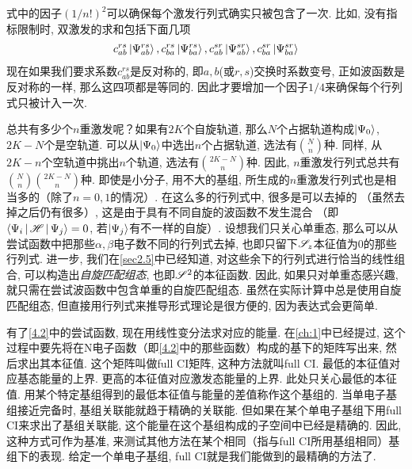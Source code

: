 式中的因子$(1/n!)^2$可以确保每个激发行列式确实只被包含了一次. 
比如, 
没有指标限制时, 
双激发的求和包括下面几项
\begin{align*}
c_{ab}^{rs}\Ket{\Psi_{ab}^{rs}}, 
c_{ba}^{rs}\Ket{\Psi_{ba}^{rs}}, 
c_{ab}^{sr}\Ket{\Psi_{ab}^{sr}},
c_{ba}^{sr}\Ket{\Psi_{ba}^{sr}}
\end{align*}
现在如果我们要求系数$c_{ab}^{rs}$是反对称的, 
即$a,b$(或$r,s$)交换时系数变号, 
正如波函数是反对称的一样, 
那么这四项都是等同的. 
因此才要增加一个因子$1/4$来确保每个行列式只被计入一次.


总共有多少个$n$重激发呢？如果有$2K$个自旋轨道, 
那么$N$个占据轨道构成$\Ket{\Psi_0}$, 
$2K-N$个是空轨道. 
可以从$\Ket{\Psi_0}$中选出$n$个占据轨道, 
选法有$\binom{N}{n}$种. 
同样, 
从$2K-n$个空轨道中挑出$n$个轨道, 
选法有$\binom{2K-N}{n}$种. 
因此, 
$n$重激发行列式总共有$\binom{N}{n}\binom{2K-N}{n}$种. 
即使是小分子, 
用不大的基组, 
所生成的$n$重激发行列式也是相当多的（除了$n=0,1$的情况）. 
在这么多的行列式中, 
很多是可以去掉的 （虽然去掉之后仍有很多）,
这是由于具有不同自旋的波函数不发生混合 （即$\Braket{\Psi_i|\mathscr{H}|\Psi_j}=0$, 
若$\Ket{\Psi_j}$有不一样的自旋）. 
设想我们只关心单重态, 
那么可以从尝试函数中把那些$\alpha,\beta$电子数不同的行列式去掉, 
也即只留下$\mathscr{S}_z$本征值为0的那些行列式. 
进一步, 
我们在\ref{sec2.5}中已经知道, 
对这些余下的行列式进行恰当的线性组合, 
可以构造出\emph{自旋匹配组态}, 
也即$\mathscr{S}^2$的本征函数. 
因此, 
如果只对单重态感兴趣, 
就只需在尝试波函数中包含单重的自旋匹配组态. 
虽然在实际计算中总是使用自旋匹配组态, 
但直接用行列式来推导形式理论是很方便的, 
因为表达式会更简单.


有了\eqref{4.2}中的尝试函数, 
现在用线性变分法求对应的能量. 
在\ref{ch:1}中已经提过, 
这个过程中要先将\ha 在N电子函数（即\eqref{4.2}中的那些函数）构成的基下的矩阵写出来, 
然后求出其本征值. 
这个矩阵叫做full CI矩阵, 
这种方法就叫full CI. 
最低的本征值对应基态能量的上界. 
更高的本征值对应激发态能量的上界. 
此处只关心最低的本征值. 
用某个特定基组得到的最低本征值与\hft 能量的差值称作这个基组的. 
当单电子基组接近完备时, 
基组关联能就趋于精确的关联能. 
但如果在某个单电子基组下用full CI来求出了基组关联能, 
这个能量在这个基组构成的子空间中已经是精确的. 
因此, 
这种方式可作为基准, 
来测试其他方法在某个相同（指与full CI所用基组相同）基组下的表现. 
给定一个单电子基组, 
full CI就是我们能做到的最精确的方法了.


